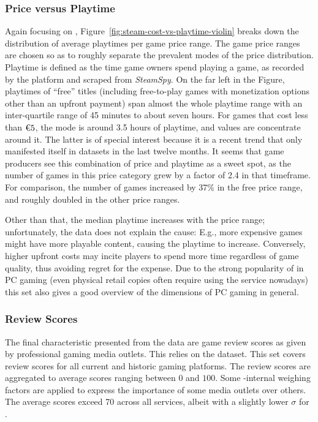 \subsubsection{Price versus Playtime}
Again focusing on \steam,
Figure~\ref{fig:steam-cost-vs-playtime-violin} breaks down the
distribution of average playtimes per game price range. The game price
ranges are chosen so as to roughly separate the prevalent modes of the
price distribution.
Playtime is defined as the time game owners spend playing a game, as
recorded by the \steam platform and scraped from \textit{SteamSpy}.
On the far left in the Figure, playtimes of ``free'' titles
(including free-to-play games with monetization options other than an
upfront payment) span almost the whole playtime range with an
inter-quartile range of 45 minutes to about seven hours.
For games that cost less than $\text{\texteuro} 5$, the mode is around
3.5 hours of playtime, and values are concentrate around it. The
latter is of special interest because it is a recent trend that only
manifested itself in datasets in the last twelve months. It seems that
game producers see this combination of price and playtime as a sweet
spot, as the number of games in this price category grew by a factor of
2.4 in that timeframe. For comparison, the number of games
increased by 37\% in the free price range, and roughly doubled
in the other price ranges.

Other than that, the median playtime increases with the price range;
unfortunately, the data does not explain the cause: E.g., more expensive
games might have more playable content, causing the playtime to
increase. Conversely, higher upfront costs may incite players to spend
more time regardless of game quality, thus avoiding regret for the
expense.
Due to the strong popularity of \steam in \gls{PC} gaming (even physical
retail copies often require using the service nowadays) this set also
gives a good overview of the dimensions of \gls{PC} gaming in general.


\subsubsection{Review Scores}

The final characteristic presented from the data are game review scores as
given by professional gaming media outlets. This relies on the
\metacritic dataset. This set covers review scores for all current
and historic gaming platforms. The review scores are aggregated to
average scores ranging between $0$ and $100$. Some \metacritic-internal
weighing factors are applied to express the importance of some media
outlets over others.
The average scores exceed 70 across all services, albeit with a
slightly lower $\sigma$ for \gfnow.

